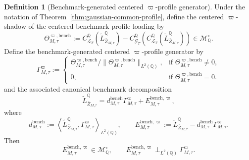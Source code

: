 \documentclass[11pt,a4paper]{amsart}
\theoremstyle{plain}
\theoremstyle{definition}
\newtheorem{definition}[theorem]{Definition}
\theoremstyle{remark}
\newcommand{\QQ}{\mathbb{Q}}
\newcommand{\cG}{\mathcal{G}}
\newcommand{\cL}{\mathcal{L}}
\newcommand{\cM}{\mathcal{M}}
\begin{document}
\begin{definition}[Benchmark-generated centered \(\varpi\)-profile generator]\label{def:lambda-generator}
Under the notation of Theorem~\ref{thm:gaussian-common-profile}, define the centered
\(\varpi\)-shadow of the centered benchmark-profile loading by
\[
        \Theta_{M,\tau}^{\varpi,\mathrm{bench}}
        :=
        C_{\cL_T}^\QQ(\widetilde L_{\bar Z_{M,\tau}}^\QQ)
        -
        C_{\cG_T}^\QQ\!\left(
                C_{\cL_T}^\QQ(\widetilde L_{\bar Z_{M,\tau}}^\QQ)
        \right)
        \in \cM_\QQ^\circ.
\]
Define the benchmark-generated centered \(\varpi\)-profile generator by
\[
        \Gamma_{M,\tau}^\varpi
        :=
        \begin{cases}
                \Theta_{M,\tau}^{\varpi,\mathrm{bench}}
                \big/
                \|\Theta_{M,\tau}^{\varpi,\mathrm{bench}}\|_{L^2(\QQ)},
                &\text{if }\Theta_{M,\tau}^{\varpi,\mathrm{bench}}\neq0,\\[0.75em]
                0,&\text{if }\Theta_{M,\tau}^{\varpi,\mathrm{bench}}=0.
        \end{cases}
\]
and the associated canonical benchmark decomposition
\[
        \widetilde L_{\bar Z_{M,\tau}}^\QQ
        =
        d_{M,\tau}^{\mathrm{bench}}\Gamma_{M,\tau}^\varpi
        +
        E_{M,\tau}^{\mathrm{bench},\varpi},
\]
where
\[
        d_{M,\tau}^{\mathrm{bench}}
        :=
        \left\langle
                \widetilde L_{\bar Z_{M,\tau}}^\QQ,
                \Gamma_{M,\tau}^\varpi
        \right\rangle_{L^2(\QQ)},
        \qquad
        E_{M,\tau}^{\mathrm{bench},\varpi}
        :=
        \widetilde L_{\bar Z_{M,\tau}}^\QQ
        -
        d_{M,\tau}^{\mathrm{bench}}\Gamma_{M,\tau}^\varpi.
 \]
Then
\[
        E_{M,\tau}^{\mathrm{bench},\varpi}\in \cM_\QQ^\circ,
        \qquad
        E_{M,\tau}^{\mathrm{bench},\varpi}
        \perp_{L^2(\QQ)}
        \Gamma_{M,\tau}^\varpi.
\]
\end{definition}
\end{document}
